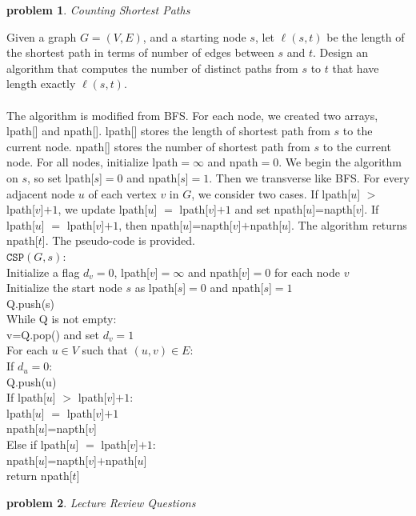 \documentclass[10pt]{article}
\newcommand{\points}[1]{\normalfont{[#1 points]}}
\newtheorem{problem}{\sc\color{cit}problem}
\begin{document}
\begin{problem} Counting Shortest Paths \points{13} \end{problem}
Given a graph $G = (V, E)$, and a starting node $s$, let $\ell(s, t)$ be the length of the shortest path in terms of number of edges between $s$ and $t$. Design an algorithm that computes the number of distinct paths from $s$ to $t$ that have length exactly $\ell(s, t)$.\\
\\
The algorithm is modified from BFS. For each node, we created two arrays, lpath[] and npath[]. lpath[] stores the length of shortest path from $s$ to the current node. npath[] stores the number of shortest path from $s$ to the current node. For all nodes, initialize lpath$=\infty$ and npath$=0$. We begin the algorithm on $s$, so set lpath[$s$]$=0$ and npath[$s$]$=1$. Then we transverse like BFS. For every adjacent node $u$ of each vertex $v$ in $G$, we consider two cases. If lpath[$u$] $>$ lpath[$v$]$+ 1$, we update lpath[$u$] $=$ lpath[$v$]$+ 1$ and set npath[$u$]=napth[$v$]. If lpath[$u$] $=$ lpath[$v$]$+ 1$, then npath[$u$]=napth[$v$]$+$npath[$u$]. The algorithm returns npath[$t$]. The pseudo-code is provided. \\
$\mathtt{CSP}(G, s)$:\\
\-\hspace{0.5cm} Initialize a flag $d_v= 0$, lpath[$v$]$=\infty$ and npath[$v$]$=0$ for each node $v$\\
\-\hspace{0.5cm} Initialize the start node $s$ as lpath[$s$]$=0$ and npath[$s$]$=1$\\
\-\hspace{0.5cm} Q.push(s)\\
\-\hspace{0.5cm} While Q is not empty:\\
\-\hspace{1cm} v=Q.pop() and set $d_v=1$\\
\-\hspace{1cm} For each $u \in V$ such that $(u, v) \in E$:\\
\-\hspace{1.5cm} If $d_u=0$:\\
\-\hspace{2cm} Q.push(u)\\
\-\hspace{1.5cm} If lpath[$u$] $>$ lpath[$v$]$+ 1$:\\
\-\hspace{2cm} lpath[$u$] $=$ lpath[$v$]$+ 1$\\
\-\hspace{2cm} npath[$u$]=napth[$v$]\\
\-\hspace{1.5cm} Else if lpath[$u$] $=$ lpath[$v$]$+ 1$:\\
\-\hspace{2cm} npath[$u$]=napth[$v$]$+$npath[$u$]\\
\-\hspace{0.5cm} return npath[$t$]\\
\newpage
\begin{problem} Lecture Review Questions \points{20}\end{problem}
\end{document}
